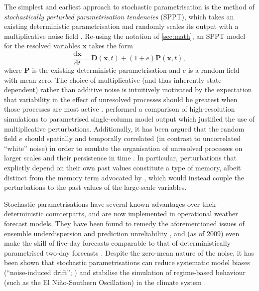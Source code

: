 \documentclass[titlepage,twoside]{article}
\numberwithin{equation}{section}
\newcommand{\diff}[2]{\frac{\mathrm{d} #1}{\mathrm{d} #2}}
\renewcommand\vec{\bm}
\begin{document}
The simplest and earliest approach to stochastic parametrisation is the method
of \emph{stochastically perturbed parametrisation tendencies} (SPPT), which
takes an existing deterministic parametrisation and randomly scales its output
with a multiplicative noise field \parencite{palmer2019,christensen2020}.
Re-using the notation of \cref{sec:math}, an SPPT model for the resolved
variables $\vec{x}$ takes the form
\begin{equation*}
    \diff{\vec{x}}{t} = \vec{D}(\vec{x},t) + (1 + e) \vec{P}(\vec{x}, t),
\end{equation*}
where $\vec{P}$ is the existing deterministic parametrisation and $e$ is a
random field with mean zero. The choice of multiplicative (and thus inherently
state-dependent) rather than additive noise is intuitively motivated by the
expectation that variability in the effect of unresolved processes should be
greatest when those processes are most active \parencite{franzke2015}.
\textcite{christensen2020} performed a comparison of high-resolution
simulations to parametrised single-column model output which justified the use
of multiplicative perturbations. Additionally, it has been argued that the
random field $e$ should spatially and temporally correlated (in contrast to
uncorrelated ``white'' noise) in order to emulate the organisation of
unresolved processes on larger scales and their persistence in time
\parencite{christensen2022,franzke2015}. In particular, perturbations that
explictly depend on their own past values constitute a type of memory, albeit
distinct from the memory term advocated by \textcite{wouters2012,wouters2013},
which would instead couple the perturbations to the past values of the
large-scale variables.

Stochastic parametrisations have several known advantages over their
deterministic counterparts, and are now implemented in operational weather
forecast models. They have been found to remedy the aforementioned issues of
ensemble underdispersion and prediction unreliability
\parencite{palmer2005,berner2017}, and (as of 2009) even make the skill of
five-day forecasts comparable to that of deterministically parametrised two-day
forecasts \parencite{palmer2019}. Despite the zero-mean nature of the noise, it
has been shown that stochastic parametrisations can reduce systematic model
biases (``noise-induced drift''; \textcite{palmer2005}) and stabilise the
simulation of regime-based behaviour (such as the El Ni\~{n}o-Southern
Oscillation) in the climate system \parencite{berner2017}.
\end{document}
